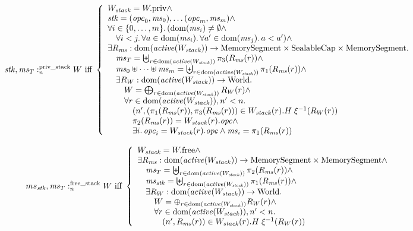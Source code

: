 \documentclass[a4paper]{article}
\begin{document}
\[
  \memSatStack{\stk,\ms_T}{W} \text{ iff } 
  \left\{
    \begin{array}{l}
      W_\var{stack} = \pwpriv \wedge \\
      \stk = (\opc_0,\ms_0), \dots (\opc_m,\ms_m) \wedge \\
      \forall i \in \{0,\dots,m\} \ldotp (\dom(\ms_i) \neq \emptyset \wedge\\
      \quad \forall i < j \ldotp \forall a \in \dom(\ms_i) \ldotp \forall a' \in \dom(\ms_j) \ldotp a < a') \wedge\\
      \exists R_\ms : \dom(\activeReg{W_\var{stack}}) \fun \MemSeg \times \SealableCaps \times \MemSeg \ldotp \\
      \quad \ms_T = \biguplus_{r \in \dom(\activeReg{W_\var{stack}})} \pi_3(R_\ms(r)) \wedge \\
      \quad \ms_0 \uplus \dots \uplus \ms_m = \biguplus_{r \in \dom(\activeReg{W_\var{stack}})} \pi_1(R_\ms(r)) \wedge \\
      \quad \exists R_W : \dom(\activeReg{W_\var{stack}}) \fun \World \ldotp \\
      \qquad W = \bigoplus_{r \in \dom(\activeReg{W_\var{stack}})} R_W(r) \wedge \\
      \qquad \forall r \in \dom(\activeReg{W_\var{stack}}), n' < n \ldotp \\
      \qquad \quad \npair[n']{(\pi_1(R_\ms(r)),\pi_3(R_\ms(r))} \in W_\var{stack}(r).H \; \xi^{-1}(R_W(r)) \\
      \qquad \quad \pi_2(R_\ms(r)) = W_\var{stack}(r).\opc \wedge\\
      \qquad \quad \exists i \ldotp \opc_i = W_\var{stack}(r).\opc \wedge \ms_i = \pi_1 (R_\ms(r))
    \end{array}
  \right.
\]

\[
  \memSatFStack{ms_\stk,\ms_T}{W} \text{ iff } 
  \left\{
    \begin{array}{l}
      W_\var{stack} = \pwfree \wedge \\
      \exists R_\ms : \dom(\activeReg{W_\var{stack}}) \fun \MemSeg \times \MemSeg \wedge \\
      \quad \ms_T = \biguplus_{r \in \dom(\activeReg{W_\var{stack}})} \pi_2(R_\ms(r)) \wedge \\
      \quad \ms_\stk = \biguplus_{r \in \dom(\activeReg{W_\var{stack}})} \pi_1(R_\ms(r)) \wedge \\
      \quad \exists R_W : \dom(\activeReg{W_\var{stack}}) \fun \World\ldotp\\
      \qquad W = \oplus_{r \in \dom(\activeReg{W_\var{stack}})} R_W(r) \wedge\\
      \qquad \forall r \in \dom(\activeReg{W_\var{stack}}), n' < n \ldotp \\
      \qquad \quad \npair[n']{R_\ms(r)} \in  W_\var{stack}(r).H \; \xi^{-1}(R_W(r))
    \end{array}
  \right.
\]
\end{document}

